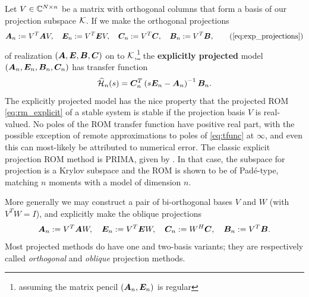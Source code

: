 \medskip
Let $V\in\mathbb{C}^{N \times n}$ be a matrix with orthogonal columns that form a basis of our projection subspace $\mathcal{K}$.  
If we make the orthogonal projections 
\begin{equation*}
          \A_n := V^T \A V, \quad \E_n := V^T \E V, \quad \CC_n := V^T\CC, \quad \BB_n := V^T\BB,
          \tag{\ref{eq:exp_projections}}
 \end{equation*}	
of realization $(\bm{A},\bm{E},\bm{B},\bm{C})$ on to $\mathcal{K}$,\footnote{assuming the matrix pencil $(\bm{A}_n,\bm{E}_n)$ is regular} the {\bf explicitly projected}  model $(\bm{A}_n,\bm{E}_n,\bm{B}_n,\bm{C}_n)$ has transfer function    
         \begin{equation}
                        \widehat{\mathcal{H}}_n(s) = \bm{C}_n^T\left(s\bm{E}_n-\bm{A}_n\right)^{-1}\bm{B}_n.
         \label{eq:rm_explicit}
         \end{equation}
The explicitly projected model  has the nice property  that the projected ROM \eqref{eq:rm_explicit} of a stable system is stable if the projection basis $V$ is real-valued.  No poles of the ROM transfer function have positive real part, with the possible  exception of remote approximations to poles of \eqref{eq:tfunc} at $\infty$, and even this can most-likely be attributed to numerical error.  The classic explicit projection ROM method is PRIMA, given by \cite{PRIMA}.  In that case, the subspace for projection is a  Krylov subspace and the ROM is shown to be of Pad\'e-type, matching $n$ moments with a model of dimension $n$.   

More generally we may construct a pair of bi-orthogonal bases $V$ and $W$ (with $V^TW=I$),  and explicitly make the oblique projections 
\[
\bm{A}_n := V^T \bm{A} W, \quad \bm{E}_n := V^T \bm{E} W, \quad \bm{C}_n := W^H\bm{C}, \quad \bm{B}_n := V^T\bm{B}.
\]
Most projected methods do have one and two-basis variants; they are  respectively called \emph{orthogonal} and \emph{oblique} projection methods.

